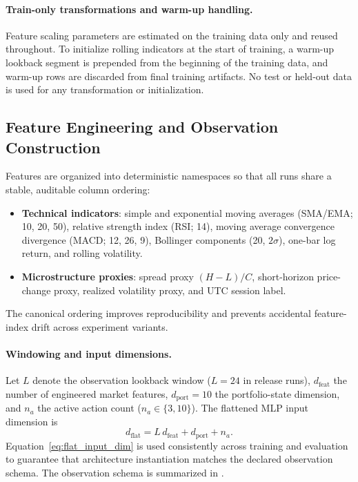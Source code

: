 \paragraph{Train-only transformations and warm-up handling.}
Feature scaling parameters are estimated on the training data only and reused throughout. To initialize rolling indicators at the start of training, a warm-up lookback segment is prepended from the beginning of the training data, and warm-up rows are discarded from final training artifacts. No test or held-out data is used for any transformation or initialization.

\subsection{Feature Engineering and Observation Construction}
Features are organized into deterministic namespaces so that all runs share a stable, auditable column ordering:
\begin{itemize}[leftmargin=1.4em]
    \item \textbf{Technical indicators}: simple and exponential moving averages (SMA/EMA; 10, 20, 50), relative strength index (RSI; 14), moving average convergence divergence (MACD; 12, 26, 9), Bollinger components (20, $2\sigma$), one-bar log return, and rolling volatility.
	\item \textbf{Microstructure proxies}: spread proxy $(H-L)/C$, short-horizon price-change proxy, realized volatility proxy, and UTC session label.
\end{itemize}
The canonical ordering improves reproducibility and prevents accidental feature-index drift across experiment variants.

\paragraph{Windowing and input dimensions.}
Let $L$ denote the observation lookback window ($L=24$ in release runs), $d_{\mathrm{feat}}$ the number of engineered market features, $d_{\mathrm{port}}=10$ the portfolio-state dimension, and $n_a$ the active action count ($n_a \in \{3,10\}$). The flattened MLP input dimension is
\begin{equation}
d_{\mathrm{flat}} = L\,d_{\mathrm{feat}} + d_{\mathrm{port}} + n_a.
\label{eq:flat_input_dim}
\end{equation}
Equation~\ref{eq:flat_input_dim} is used consistently across training and evaluation to guarantee that architecture instantiation matches the declared observation schema.
The observation schema is summarized in .


